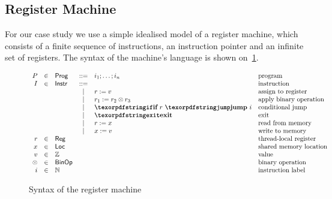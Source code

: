\subsection{Register Machine}

For our case study we use a simple idealised model 
of a register machine, which consists of a finite 
sequence of instructions, an instruction pointer 
and an infinite set of registers. 
The syntax of the machine's language is 
shown on~\cref{fig:regmachine-syntax}.

\begin{figure}[h!]
\[
\begin{array}{rclclll}
  P &\in& \Prog   &::=& i_1 \seq \dots \seq i_n           & \text{program}                 \\

  I &\in& \Inst     &::=&                                 & \text{instruction}             \\
              & &   & | & \assignInst{r}{v}               & \text{assign to register}      \\
              & &   & | & \opInst{\otimes}{r_1}{r_2}{r_3}  & \text{apply binary operation}  \\
              & &   & | & \jumpInst{r}{\ip{i}}            & \text{conditional jump}        \\
              & &   & | & \exitInst                       & \text{exit}                    \\
              & &   & | & \readInst{r}{x}                 & \text{read from memory}        \\
              & &   & | & \writeInst{x}{v}                & \text{write to memory}         \\

  r      &\in& \Reg     &   &                    & \text{thread-local register}   \\ 
  x      &\in& \Loc     &   &                    & \text{shared memory location}  \\ 
  v      &\in& \Z       &   &                    & \text{value}                   \\
  \otimes&\in& \BinOp   &   &                    & \text{binary operation}        \\
  \ip{i} &\in& \N       &   &                    & \text{instruction label}       \\ 

\end{array}
\] 
\caption{Syntax of the register machine}
\label{fig:regmachine-syntax}
\end{figure}


